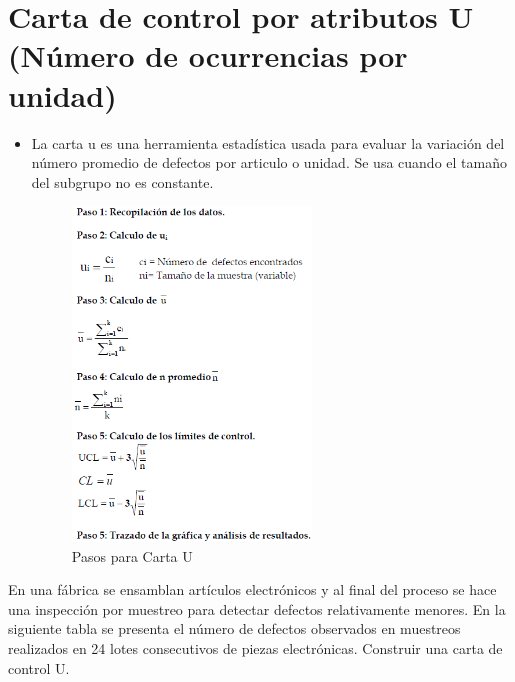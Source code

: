\documentclass{article}
\theoremstyle{mytheoremstyle}
\theoremstyle{mytheoremstyle}
\theoremstyle{myproblemstyle}
\begin{document}
\section{Carta de control por atributos U (Número de ocurrencias por unidad)}
\begin{itemize}
	\item La carta u es una herramienta estadística usada para evaluar la variación del número promedio
	de defectos por articulo o unidad. Se usa cuando el tamaño del subgrupo no es constante.
	\begin{figure}[H]
		\centering
		\includegraphics[width=0.6\textwidth]{CartaU.png}
		\caption[short]{Pasos para Carta U}
		\label{fig:imagen2}
	  \end{figure}
\end{itemize}	 
En una fábrica se ensamblan artículos electrónicos y al final del proceso se hace una
inspección por muestreo para detectar defectos relativamente menores. En la siguiente tabla se
presenta el número de defectos observados en muestreos realizados en 24 lotes consecutivos de
piezas electrónicas. Construir una carta de control U.
\end{document}
